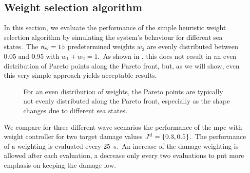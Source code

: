\begin{figure}[htb]
	\centering
	\fontsize{8}{0}\selectfont
	\def\svgwidth{0.49\textwidth}
	
	\caption{}
	\label{}
\end{figure}

\begin{figure}[htb]
	\centering
	\fontsize{8}{0}\selectfont
	\def\svgwidth{0.49\textwidth}
	
	\caption{}
	\label{}
\end{figure}

\subsection{Weight selection algorithm}
In this section, we evaluate the performance of the simple heuristic weight selection algorithm by simulating the system's behaviour for different sea states.\ 
The $n_\mathrm{w}=15$ predetermined weights $w_2$ are evenly distributed between 0.05 and 0.95 with $w_1+w_2=1$.\ 
As shown in , this does not result in an even distribution of Pareto points along the Pareto front, but, as we will show, even this very simple approach yields acceptable results.\
\begin{figure}[htb]
	\centering
	\fontsize{8}{0}\selectfont
	\def\svgwidth{0.4\textwidth}
	
	\caption{For an even distribution of weights, the Pareto points are typically not evenly distributed along the Pareto front, especially as the shape changes due to different sea states.}
	\label{fig:PF}
\end{figure}

We compare for three different wave scenarios the performance of the \ac{mpc} with weight controller for two target damage values $J^\mathrm{d} = \left\{0.3, 0.5\right\}$.\ 
The performance of a weighting is evaluated every \SI{25}{\second}.\ 
An increase of the damage weighting is allowed after each evaluation, a decrease only every two evaluations to put more emphasis on keeping the damage low.

